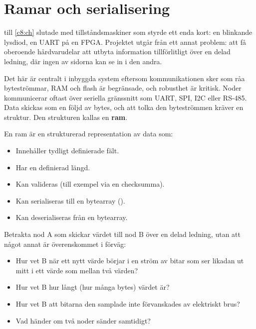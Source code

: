 
\section{Ramar och serialisering}
\label{c10:sec:framing}

 till \ref{c8:ch} slutade med tillståndsmaskiner som styrde ett enda kort: en
blinkande lysdiod, en UART på en FPGA. Projektet utgår från ett annat problem: att få oberoende
hårdvarudelar att utbyta information tillförlitligt över en delad ledning, där ingen av sidorna kan
se in i den andra.

Det här är centralt i inbyggda system eftersom kommunikationen sker som råa byteströmmar, RAM och
flash är begränsade, och robusthet är kritisk. Noder kommunicerar oftast över seriella gränssnitt
som UART, SPI, I2C eller RS-485. Data skickas som en följd av bytes, och att tolka den byteströmmen
kräver en struktur. Den strukturen kallas en \textbf{ram}.

En ram är en strukturerad representation av data som:
\begin{itemize}
  \item Innehåller tydligt definierade fält.
  \item Har en definierad längd.
  \item Kan valideras (till exempel via en checksumma).
  \item Kan serialiseras till en bytearray ().
  \item Kan deserialiseras från en bytearray.
\end{itemize}

Betrakta nod A som skickar värdet  till nod B över en delad ledning, utan att något annat
är överenskommet i förväg:
\begin{itemize}
  \item Hur vet B när ett nytt värde börjar i en ström av bitar som ser likadan ut mitt i ett värde
    som mellan två värden?
  \item Hur vet B hur långt (hur många bytes) värdet är?
  \item Hur vet B att bitarna den samplade inte förvanskades av elektriskt brus?
  \item Vad händer om två noder sänder samtidigt?
\end{itemize}

